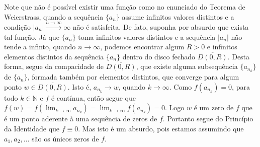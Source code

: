    Note que não é possível existir uma função como no enunciado do Teorema
    de Weierstrass, quando a sequência $\{a_n\}$ 
    assume infinitos valores distintos e
    a condição $|a_n| \xrightarrow{n\to\infty} \infty$ não é satisfeita.
    De fato, suponha por absurdo que exista tal função. 
    Já que $\{a_n\}$ toma infinitos valores distintos e 
    a sequência $|a_n|$ não tende a infinto, quando $n\to \infty$,
    podemos encontrar algum $R>0$ e infinitos elementos distintos 
    da sequência $\{a_n\}$ dentro do disco fechado $\overline{D(0,R)}$. 
    Desta forma, segue da compacidade de $\overline{D(0,R)}$, 
    que existe alguma 
    subsequência $\{a_{n_{k}}\}$ de $\{a_n\}$, formada também
    por elementos distintos, que converge
    para algum ponto $w\in \overline{D(0,R)}$.
    Isto é, $a_{n_{k}}\to w$, quando $k\to\infty$.
    Como $f(a_{n_{k}})=0$, para  todo $k\in\mathbb{N}$ 
    e $f$ é contínua, então segue que 
    $f(w)=f(\lim_{k\to\infty} a_{n_k})=\lim_{k\to\infty} f(a_{n_k}) =0$.  
    Logo $w$ é um zero de $f$ que é um ponto aderente à uma 
    sequência de zeros de $f$. Portanto segue do Princípio da Identidade 
    que $f\equiv 0$. Mas isto é um absurdo, pois estamos assumindo 
    que $a_1, a_2, \dots$ são os únicos zeros de $f$.
 
 
 \bigskip 
 
